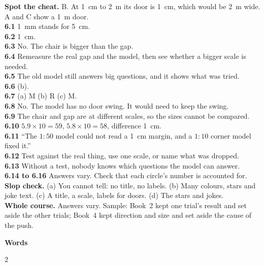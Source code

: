 \textbf{Spot the cheat.} B. At 1~cm to 2~m its door is 1~cm, which would be 2~m wide. A and C show a 1~m door.\\
\textbf{6.1} 1~mm stands for 5~cm.\\
\textbf{6.2} 1~cm.\\
\textbf{6.3} No. The chair is bigger than the gap.\\
\textbf{6.4} Remeasure the real gap and the model, then see whether a bigger scale is needed.\\
\textbf{6.5} The old model still answers big questions, and it shows what was tried.\\
\textbf{6.6} (b).\\
\textbf{6.7} (a) M (b) R (c) M.\\
\textbf{6.8} No. The model has no door swing. It would need to keep the swing.\\
\textbf{6.9} The chair and gap are at different scales, so the sizes cannot be compared.\\
\textbf{6.10} $5.9\times10=59$, $5.8\times10=58$, difference 1~cm.\\
\textbf{6.11} ``The $1:50$ model could not read a 1~cm margin, and a $1:10$ corner model fixed it.''\\
\textbf{6.12} Test against the real thing, use one scale, or name what was dropped.\\
\textbf{6.13} Without a test, nobody knows which questions the model can answer.\\
\textbf{6.14 to 6.16} Answers vary. Check that each circle's number is accounted for.\\
\textbf{Slop check.} (a) You cannot tell: no title, no labels. (b) Many colours, stars and joke text. (c) A title, a scale, labels for doors. (d) The stars and jokes.\\
\textbf{Whole course.} Answers vary. Sample: Book~2 kept one trial's result and set aside the other trials; Book~4 kept direction and size and set aside the cause of the push.

\clearpage\label{notes}
{\sans\bfseries\LARGE\color{ink} Words}\par
\small
\begin{multicols}{2}
\end{multicols}

